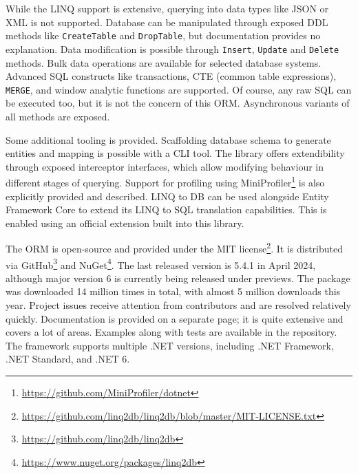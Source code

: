 While the LINQ support is extensive, querying into data types like JSON or XML is not supported. 
Database can be manipulated through exposed DDL methods like \texttt{CreateTable} and \texttt{DropTable}, but documentation provides no explanation. Data modification is possible through \texttt{Insert}, \texttt{Update} and \texttt{Delete} methods. Bulk data operations are available for selected database systems.
Advanced SQL constructs like transactions, CTE (common table expressions), \texttt{MERGE}, and window analytic functions are supported. Of course, any raw SQL can be executed too, but it is not the concern of this ORM. Asynchronous variants of all methods are exposed.

Some additional tooling is provided. Scaffolding database schema to generate entities and mapping is possible with a CLI tool. The library offers extendibility through exposed interceptor interfaces, which allow modifying behaviour in different stages of querying. Support for profiling using MiniProfiler\footnote{\url{https://github.com/MiniProfiler/dotnet}} is also explicitly provided and described.
LINQ to DB can be used alongside Entity Framework Core to extend its LINQ to SQL translation capabilities. This is enabled using an official extension built into this library.

The ORM is open-source and provided under the MIT license\footnote{\url{https://github.com/linq2db/linq2db/blob/master/MIT-LICENSE.txt}}. It is distributed via GitHub\footnote{\url{https://github.com/linq2db/linq2db}} and NuGet\footnote{\url{https://www.nuget.org/packages/linq2db}}. The last released version is 5.4.1 in April 2024, although major version 6 is currently being released under previews. The package was downloaded 14 million times in total, with almost 5 million downloads this year. Project issues receive attention from contributors and are resolved relatively quickly. Documentation is provided on a separate page; it is quite extensive and covers a lot of areas. Examples along with tests are available in the repository. The framework supports multiple .NET versions, including .NET Framework, .NET Standard, and .NET 6.

